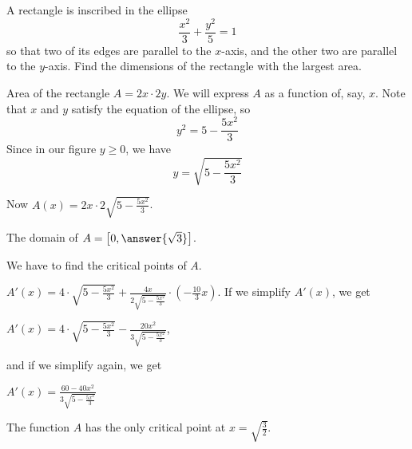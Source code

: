 \documentclass{ximera}
\author{Bart Snapp\and Nela Lakos}
\begin{document}
\begin{exercise}

  A rectangle is inscribed in the ellipse
  \[
  \frac{x^2}{3}+\frac{y^2}{5}=1
  \]
  so that two of its edges are parallel to the $x$-axis, and the other two are parallel to the $y$-axis.
  Find the dimensions of the rectangle with the largest area.
  \begin{hint}
  \begin{image}
\end{image}
\end{hint}
\begin{hint}
Area of the rectangle
 $A=2x\cdot 2y$. 
 We will express $A$ as a function of, say, $x$.
Note that $x$ and $y$ satisfy the equation of the ellipse, so
 \[
y^2=5-  \frac{5x^2}{3}
  \]
Since in our figure $y\ge0$, we have 
 \[
y=\sqrt{5-  \frac{5x^2}{3}}
  \]
\end{hint}
\begin{hint}
Now
$A(x)=2x\cdot 2\sqrt{5-  \frac{5x^2}{3}}$.

The domain of $A=\left[0,\answer{\sqrt{3}}\right]$.
\end{hint}
\begin{hint}
We have to find the critical points of $A$.


$A'(x)=4\cdot \sqrt{5-  \frac{5x^2}{3}}+\frac{4x}{2\sqrt{5-  \frac{5x^2}{3}}}\cdot \left(-\frac{10}{3}x\right)$.
If we simplify $A'(x)$, we get

$A'(x)=4\cdot \sqrt{5-  \frac{5x^2}{3}}-\frac{20x^2}{3\sqrt{5-  \frac{5x^2}{3}}}$, 

and if we simplify again, we get

$A'(x)=\frac{60-40x^2}{3\sqrt{5-  \frac{5x^2}{3}}}$

The function $A$ has the only critical point at $x=\sqrt{\frac{3}{2}}$.
\end{hint}
\begin{hint}


\end{hint}
\end{exercise}
\end{document}
